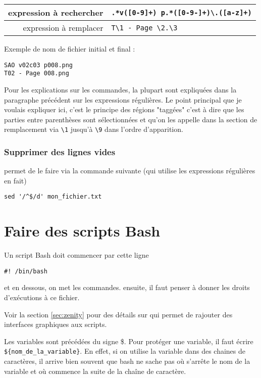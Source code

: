 \documentclass[a4paper,twoside]{article}
\begin{document}
\begin{tabular}{|r|l|}
\hline
expression à rechercher & \verb|.*v([0-9]+) p.*([0-9-]+)\.([a-z]+)|\\\hline
expression à remplacer & \verb|T\1 - Page \2.\3|\\\hline
\end{tabular}

Exemple de nom de fichier initial et final :
\begin{verbatim}
SAO v02c03 p008.png
T02 - Page 008.png
\end{verbatim}

Pour les explications sur les commandes, la plupart sont expliquées dans la paragraphe précédent sur les expressions régulières. Le point principal que je voulais expliquer ici, c'est le principe des régions "taggées" c'est à dire que les parties entre parenthèses sont sélectionnées et qu'on les appelle dans la section de remplacement via \verb|\1| jusqu'à \verb|\9| dans l'ordre d'apparition.

\subsubsection{Supprimer des lignes vides}
 permet de le faire via la commande suivante (qui utilise les expressions régulières en fait)

\begin{verbatim}
sed '/^$/d' mon_fichier.txt
\end{verbatim}


\section{Faire des scripts Bash}
Un script Bash doit commencer par cette ligne
\begin{verbatim}
#! /bin/bash
\end{verbatim}
et en dessous, on met les commandes. ensuite, il faut penser à donner les droits d'exécutions à ce fichier.

Voir la section \ref{sec:zenity} pour des détails sur  qui permet de rajouter des interfaces graphiques aux scripts.

Les variables sont précédées du signe \$. Pour \og protéger \fg une variable, il faut écrire \\ \verb|${nom_de_la_variable}|. En effet, si on utilise la variable dans des chaines de caractères, il arrive bien souvent que bash ne sache pas où s'arrête le nom de la variable et où commence la suite de la chaîne de caractère.
\end{document}
